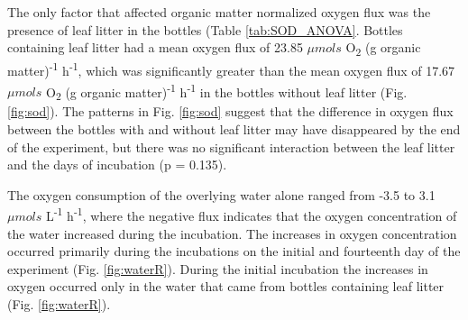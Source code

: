 The only factor that affected organic matter normalized oxygen flux was the presence of leaf litter in the bottles (Table \ref{tab:SOD_ANOVA}. Bottles containing leaf litter had a mean oxygen flux of 23.85 $\mu mols$ O\textsubscript{2} (g organic matter)\textsuperscript{-1} h\textsuperscript{-1}, which was significantly greater than the mean oxygen flux of 17.67 $\mu mols$ O\textsubscript{2} (g organic matter)\textsuperscript{-1} h\textsuperscript{-1} in the bottles without leaf litter (Fig. \ref{fig:sod}). The patterns in Fig. \ref{fig:sod} suggest that the difference in oxygen flux between the bottles with and without leaf litter may have disappeared by the end of the experiment, but there was no significant interaction between the leaf litter and the days of incubation (p = 0.135).

The oxygen consumption of the overlying water alone ranged from -3.5 to 3.1 $\mu mols$ L\textsuperscript{-1} h\textsuperscript{-1}, where the negative flux indicates that the oxygen concentration of the water increased during the incubation.  The increases in oxygen concentration occurred primarily during the incubations on the initial and fourteenth day of the experiment (Fig. \ref{fig:waterR}). During the initial incubation the increases in oxygen occurred only in the water that came from bottles containing leaf litter (Fig. \ref{fig:waterR}).




    